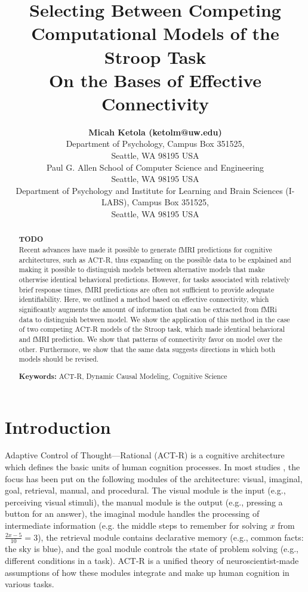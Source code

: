 \documentclass[10pt,letterpaper]{article}
\title{Selecting Between Competing Computational Models of the Stroop Task \\ On the Bases of Effective Connectivity}
\author{{\large \bf Micah Ketola (ketolm@uw.edu)} \\
  Department of Psychology, Campus Box 351525, \\
  Seattle, WA 98195 USA
  \AND {\large \bf Linxing Preston Jiang (prestonj@cs.washington.edu)} \\
  Paul G. Allen School of Computer Science and Engineering\\
  Seattle, WA 98195 USA 
  \AND {\large \bf Andrea Stocco (stocco@uw.edu)} \\
  Department of Psychology and Institute for Learning and Brain Sciences (I-LABS), Campus Box 351525, \\
  Seattle, WA 98195 USA}
\begin{document}
\maketitle


\begin{abstract}
\textbf{TODO} \\
Recent advances have made it possible to generate fMRI predictions for cognitive architectures, such as ACT-R, thus expanding on the possible data to be explained and making it possible to distinguish models between alternative models that make otherwise identical behavioral predictions. However, for tasks associated with relatively brief response times, fMRI predictions are often not sufficient to provide adequate identifiability. Here, we outlined a method based on effective connectivity, which significantly augments the amount of information that can be extracted from fMRi data to distinguish between model. We show the application of this method in the case of two competing ACT-R models of the Stroop task, which made identical behavioral and fMRI prediction. We show that patterns of connectivity favor on model over the other. Furthermore, we show that the same data suggests directions in which both models should be revised.

\textbf{Keywords:} 
ACT-R, Dynamic Causal Modeling, Cognitive Science
\end{abstract}


\section{Introduction}

Adaptive Control of Thought—Rational (ACT-R) \cite{Anderson2004} is a cognitive architecture which defines the basic units of human cognition processes. In most studies \cite{Anderson2004, Anderson2008, Stocco2018, Borst2017}, the focus has been put on the following modules of the architecture: visual, imaginal, goal, retrieval, manual, and procedural. The visual module is the input (e.g., perceiving visual stimuli), the manual module is the output (e.g., pressing a button for an answer), the imaginal module handles the processing of intermediate information (e.g. the middle steps to remember for solving $x$ from $\frac{2x - 5}{10} = 3$), the retrieval module contains declarative memory (e.g., common facts: the sky is blue), and the goal module controls the state of problem solving (e.g., different conditions in a task). ACT-R is a unified theory of neuroscientist-made assumptions of how these modules integrate and make up human cognition in various tasks. 
\end{document}
